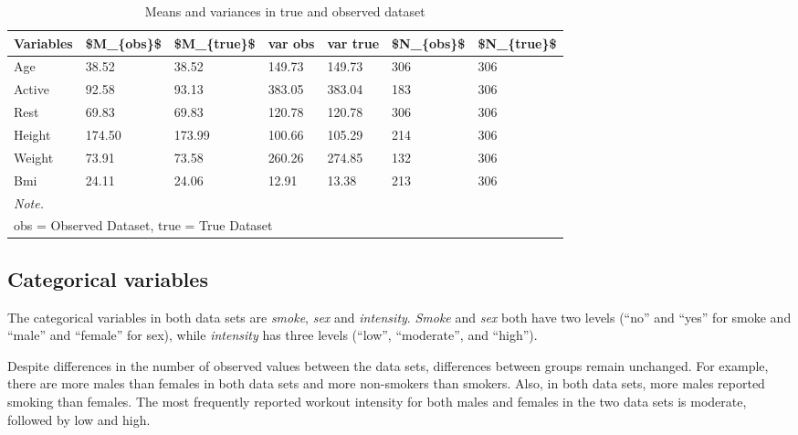 \documentclass[
]{article}
\begin{document}
\begin{table}

\caption{\label{tab:des}Means and variances in true and observed dataset}
\centering
\begin{tabular}[t]{l|l|l|l|l|l|l}
\hline
Variables & \$M\_\{obs\}\$ & \$M\_\{true\}\$ & var obs & var true & \$N\_\{obs\}\$ & \$N\_\{true\}\$\\
\hline
Age & 38.52 & 38.52 & 149.73 & 149.73 & 306 & 306\\
\hline
Active & 92.58 & 93.13 & 383.05 & 383.04 & 183 & 306\\
\hline
Rest & 69.83 & 69.83 & 120.78 & 120.78 & 306 & 306\\
\hline
Height & 174.50 & 173.99 & 100.66 & 105.29 & 214 & 306\\
\hline
Weight & 73.91 & 73.58 & 260.26 & 274.85 & 132 & 306\\
\hline
Bmi & 24.11 & 24.06 & 12.91 & 13.38 & 213 & 306\\
\hline
\multicolumn{7}{l}{\rule{0pt}{1em}\textit{Note.}}\\
\multicolumn{7}{l}{\rule{0pt}{1em}obs = Observed Dataset, true = True Dataset}\\
\end{tabular}
\end{table}

\hypertarget{data2}{%
\subsection{Categorical variables}\label{data2}}

The categorical variables in both data sets are \emph{smoke}, \emph{sex} and \emph{intensity}. \emph{Smoke} and \emph{sex} both have two levels (``no'' and ``yes'' for smoke and ``male'' and ``female'' for sex), while \emph{intensity} has three levels (``low'', ``moderate'', and ``high'').

Despite differences in the number of observed values between the data sets, differences between groups remain unchanged. For example, there are more males than females in both data sets and more non-smokers than smokers. Also, in both data sets, more males reported smoking than females. The most frequently reported workout intensity for both males and females in the two data sets is moderate, followed by low and high.
\end{document}
